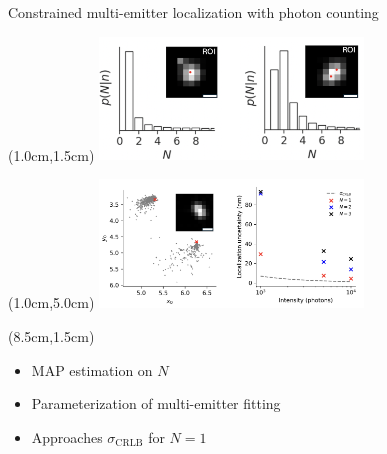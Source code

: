 \documentclass{beamer}					%
\begin{document}
\begin{frame}{Constrained multi-emitter localization with photon counting}

\begin{textblock*}{7cm}(1.0cm,1.5cm)
\includegraphics[width=7cm]{../../spad/spad/media/Figure-4.png}
\end{textblock*}

\begin{textblock*}{7cm}(1.0cm,5.0cm)
\includegraphics[width=7cm]{../../spad/spad/media/Figure-5.png}
\end{textblock*}


\begin{textblock*}{6cm}(8.5cm,1.5cm)
\begin{itemize}
\item MAP estimation on $N$
\item Parameterization of multi-emitter fitting
\item Approaches $\sigma_{\mathrm{CRLB}}$ for $N=1$
\end{itemize}
\end{textblock*}

\end{frame}
\end{document}
